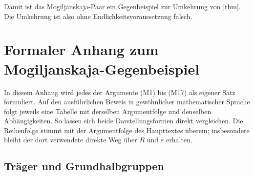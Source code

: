 \documentclass[main.tex]{subfiles}
\begin{document}
\MogTableProofHeading
\begin{tabproofwide}
\end{tabproofwide}

Damit ist das Mogiljanskaja-Paar ein Gegenbeispiel zur Umkehrung von
[thm].
Die Umkehrung ist also ohne Endlichkeitsvoraussetzung falsch.

\chapter{Formaler Anhang zum Mogiljanskaja-Gegenbeispiel}

In diesem Anhang wird jedes der Argumente \textup{(M1)} bis \textup{(M17)} als
eigener Satz formuliert. Auf den ausführlichen Beweis in gewöhnlicher
mathematischer Sprache folgt jeweils eine Tabelle mit derselben Argumentfolge
und denselben Abhängigkeiten. So lassen sich beide Darstellungsformen direkt
vergleichen. Die Reihenfolge stimmt mit der Argumentfolge des Haupttextes
überein; insbesondere bleibt der dort verwendete direkte Weg über \(R\) und
\(\varepsilon\) erhalten.

\section{Träger und Grundhalbgruppen}
\end{document}
